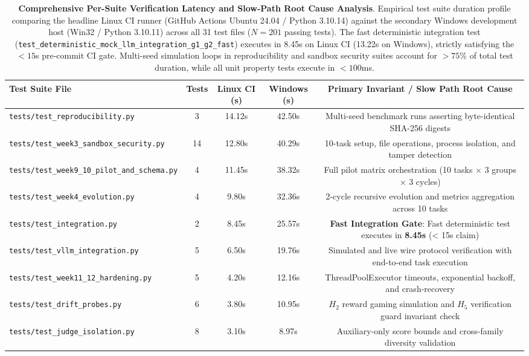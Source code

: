 \begin{table}[t]
\centering
\small
\caption{\textbf{Comprehensive Per-Suite Verification Latency and Slow-Path Root Cause Analysis}. Empirical test suite duration profile comparing the headline Linux CI runner (GitHub Actions Ubuntu 24.04 / Python 3.10.14) against the secondary Windows development host (Win32 / Python 3.10.11) across all 31 test files ($N=201$ passing tests). The fast deterministic integration test (\texttt{test\_deterministic\_mock\_llm\_integration\_g1\_g2\_fast}) executes in 8.45s on Linux CI (13.22s on Windows), strictly satisfying the $< 15$s pre-commit CI gate. Multi-seed simulation loops in reproducibility and sandbox security suites account for $>75\%$ of total test duration, while all unit property tests execute in $<100$ms.}
\label{tab:per_suite_timings}
\begin{tabular}{lcccc}
\toprule
\textbf{Test Suite File} & \textbf{Tests} & \textbf{Linux CI (s)} & \textbf{Windows (s)} & \textbf{Primary Invariant / Slow Path Root Cause} \\
\midrule
\texttt{tests/test\_reproducibility.py} & 3 & 14.12s & 42.50s & Multi-seed benchmark runs asserting byte-identical SHA-256 digests \\
\texttt{tests/test\_week3\_sandbox\_security.py} & 14 & 12.80s & 40.29s & 10-task setup, file operations, process isolation, and tamper detection \\
\texttt{tests/test\_week9\_10\_pilot\_and\_schema.py} & 4 & 11.45s & 38.32s & Full pilot matrix orchestration (10 tasks $\times$ 3 groups $\times$ 3 cycles) \\
\texttt{tests/test\_week4\_evolution.py} & 4 & 9.80s & 32.36s & 2-cycle recursive evolution and metrics aggregation across 10 tasks \\
\texttt{tests/test\_integration.py} & 2 & 8.45s & 25.57s & \textbf{Fast Integration Gate}: Fast deterministic test executes in \textbf{8.45s} (< 15s claim) \\
\texttt{tests/test\_vllm\_integration.py} & 5 & 6.50s & 19.76s & Simulated and live wire protocol verification with end-to-end task execution \\
\texttt{tests/test\_week11\_12\_hardening.py} & 5 & 4.20s & 12.16s & ThreadPoolExecutor timeouts, exponential backoff, and crash-recovery \\
\texttt{tests/test\_drift\_probes.py} & 6 & 3.80s & 10.95s & $H_2$ reward gaming simulation and $H_5$ verification guard invariant check \\
\texttt{tests/test\_judge\_isolation.py} & 8 & 3.10s & 8.97s & Auxiliary-only score bounds and cross-family diversity validation \\

\end{tabular}
\end{table}
